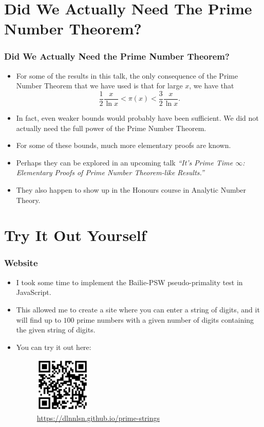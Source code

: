 \documentclass{beamer}
\begin{document}
\section{Did We Actually Need The Prime Number Theorem?}

\begin{frame}
    \frametitle{Did We Actually Need the Prime Number Theorem?}

    \begin{itemize}
        \item For some of the results in this talk, the only consequence of the Prime Number Theorem that we have used is that for large $x$, we have that
        \[
            \frac{1}{2} \frac{x}{\ln x} < \pi(x) < \frac{3}{2} \frac{x}{\ln x}.
        \]
        \pause
        \item In fact, even weaker bounds would probably have been sufficient. We did not actually need the full power of the Prime Number Theorem. \pause
        \item For some of these bounds, much more elementary proofs are known. \pause
        \item Perhaps they can be explored in an upcoming talk \emph{``It's Prime Time $\infty$: Elementary Proofs of Prime Number Theorem-like Results.''} \pause
        \item They also happen to show up in the Honours course in Analytic Number Theory.
    \end{itemize}

\end{frame}

\section{Try It Out Yourself}

\begin{frame}
    \frametitle{Website}

    \begin{itemize}
        \item I took some time to implement the Bailie-PSW pseudo-primality test in JavaScript. \pause
        \item This allowed me to create a site where you can enter a string of digits, and it will find up to $100$ prime numbers with a given number of digits containing the given string of digits. \pause
        \item You can try it out here:
        \begin{figure}
            \centering
            \includegraphics[width=0.25\textwidth]{prime_strings.png}
            \caption{\url{https://dlnnlsn.github.io/prime-strings}}
        \end{figure}
    \end{itemize}

\end{frame}
\end{document}

